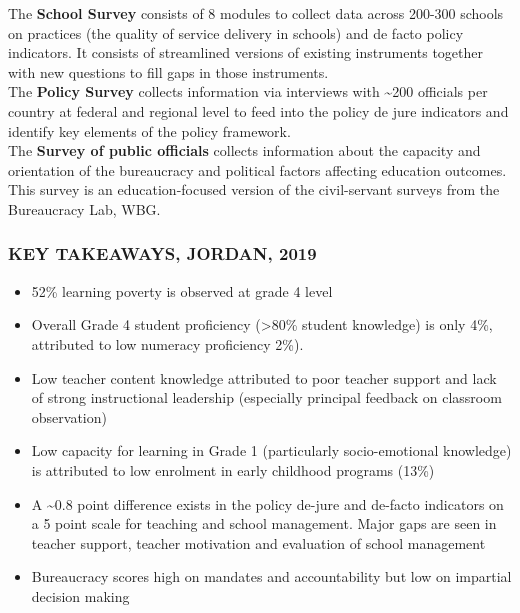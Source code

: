 \documentclass[twocolumn]{article}
\providecommand{\tightlist}{%
  \setlength{\itemsep}{0pt}\setlength{\parskip}{0pt}}
\begin{document}
The \textbf{School Survey} consists of 8 modules to collect data across
200-300 schools on practices (the quality of service delivery in
schools) and de facto policy indicators. It consists of streamlined
versions of existing instruments together with new questions to fill
gaps in those instruments.\\
The \textbf{Policy Survey} collects information via interviews with
\textasciitilde{}200 officials per country at federal and regional level
to feed into the policy de jure indicators and identify key elements of
the policy framework.\\
The \textbf{Survey of public officials} collects information about the
capacity and orientation of the bureaucracy and political factors
affecting education outcomes. This survey is an education-focused
version of the civil-servant surveys from the Bureaucracy Lab, WBG.

\hypertarget{key-takeaways-jordan-2019}{%
\subsubsection{\texorpdfstring{\textbf{KEY TAKEAWAYS, JORDAN,
2019}}{KEY TAKEAWAYS, JORDAN, 2019}}\label{key-takeaways-jordan-2019}}

\begin{itemize}
\tightlist
\item
  52\% learning poverty is observed at grade 4 level
\item
  Overall Grade 4 student proficiency (\textgreater{}80\% student
  knowledge) is only 4\%, attributed to low numeracy proficiency 2\%).
\item
  Low teacher content knowledge attributed to poor teacher support and
  lack of strong instructional leadership (especially principal feedback
  on classroom observation)
\item
  Low capacity for learning in Grade 1 (particularly socio-emotional
  knowledge) is attributed to low enrolment in early childhood programs
  (13\%)
\item
  A \textasciitilde{}0.8 point difference exists in the policy de-jure
  and de-facto indicators on a 5 point scale for teaching and school
  management. Major gaps are seen in teacher support, teacher motivation
  and evaluation of school management
\item
  Bureaucracy scores high on mandates and accountability but low on
  impartial decision making
\end{itemize}
\end{document}
